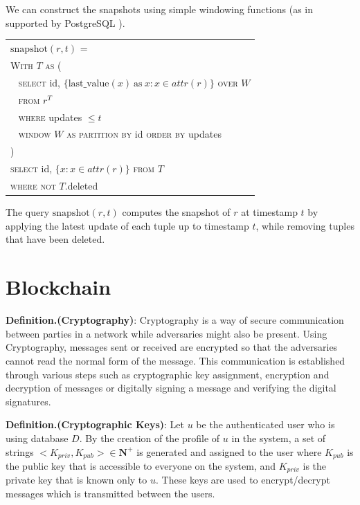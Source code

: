 We can construct the snapshots using simple windowing functions (as in supported
by PostgreSQL \cite{momjian2001postgresql}).

    \vspace{1em}
\begin{center}

{\small
	\begin{tabular}{|l|} \hline
		$\mathrm{snapshot}(r, t)$ = \\
		\verb|| \textsc{With} $T$ \textsc{as} ( \\
		\verb| | \textsc{select} id, $\{\mathrm{last\_value}(x) \mathrm{\ as\ } x:
		x\in attr(r)\}$ \textsc{over} $W$ \\
		\verb| | \textsc{from} $r^T$ \\
		\verb| | \textsc{where} updates $\leq t$ \\
		\verb| | \textsc{window} $W$ \textsc{as} 
		\textsc{partition by} id \textsc{order by} updates\\
		\verb|| ) \\
		\verb|| \textsc{select} id, $\{x: x\in attr(r)\}$ \textsc{from} $T$ \\
		\verb|| \textsc{where not} $T.$deleted \\ \hline
	\end{tabular}
}
\end{center}

The query $\mathrm{snapshot}(r, t)$ computes the snapshot of $r$ at timestamp
$t$ by applying the latest update of each tuple up to timestamp $t$, while
removing tuples that have been deleted.



\section{Blockchain}
\textbf{Definition.(Cryptography)}:
Cryptography is a way of secure communication between parties in a network while adversaries might also be present. Using Cryptography, messages sent or received are encrypted so that the adversaries cannot read the normal form of the message. This communication is established through various steps such as cryptographic key assignment, encryption and decryption of messages or digitally signing a message and verifying the digital signatures.


\textbf{Definition.(Cryptographic Keys)}: Let $u$ be the authenticated user who is using database $D$. By the creation of the profile of $u$ in the system, a set of strings $<K_{priv},K_{pub}> \in \mathbf{N}^+$ is generated and assigned to the user where $K_{pub}$ is the public key that is accessible to everyone on the system, and $K_{priv}$ is the private key that is known only to $u$. These keys are used to encrypt/decrypt messages which is transmitted between the users.


